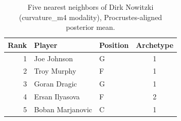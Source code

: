 \begin{table}[htbp]
  \centering\small
  \begin{tabular}{rllc}
    \toprule
    Rank & Player & Position & Archetype \\
    \midrule
    1 & Joe Johnson & G & 1 \\
    2 & Troy Murphy & F & 1 \\
    3 & Goran Dragic & G & 1 \\
    4 & Ersan Ilyasova & F & 2 \\
    5 & Boban Marjanovic & C & 1 \\
    \bottomrule
  \end{tabular}
  \caption{Five nearest neighbors of Dirk Nowitzki (curvature_m4 modality), Procrustes-aligned posterior mean.}
  \label{tab:Dirk_Nowitzki_neighbors_curvature_m4}
\end{table}

